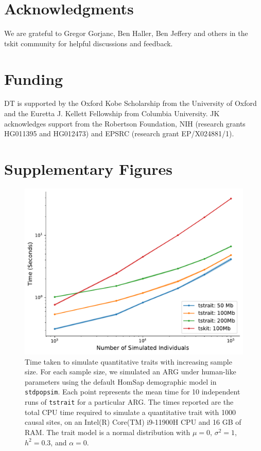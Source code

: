 \documentclass[unnumsec,webpdf,modern,large,namedate]{oup-authoring-template}%
\begin{document}
\section{Acknowledgments}
We are grateful to Gregor Gorjanc, Ben Haller, Ben Jeffery and
others in the tskit community for helpful discussions and feedback.

\section{Funding}
DT is supported by the Oxford Kobe Scholarship from the University of Oxford
and the Euretta J. Kellett Fellowship from Columbia University.
JK acknowledges support from the Robertson Foundation,
NIH (research grants HG011395 and HG012473) and
EPSRC (research grant EP/X024881/1).





\clearpage

\renewcommand\thefigure{S\arabic{figure}}
\setcounter{figure}{0}
\renewcommand\thetable{S\arabic{table}}
\setcounter{table}{0}
\section{Supplementary Figures}

\begin{figure}[t]%
\centering
\includegraphics[width=\columnwidth]{figures/computational-time-code/stdpopsim-time.pdf}
\caption{Time taken to simulate quantitative traits with increasing
sample size. For each sample size, we simulated an ARG under human-like
parameters using the default HomSap demographic model in \texttt{stdpopsim}.
Each point represents the mean time for 10 independent runs of \texttt{tstrait}
for a particular ARG. The times reported are the total CPU
time required to simulate a quantitative trait with 1000 causal sites,
on an Intel(R) Core(TM) i9-11900H CPU and 16 GB of RAM.
The trait model is a normal distribution with $\mu=0$,
$\sigma^2=1$, $h^2=0.3$, and $\alpha=0$.
}\label{fig:time}
\end{figure}
\end{document}
